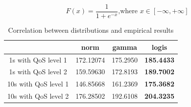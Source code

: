 \documentclass[conference]{../../setup/IEEEtran}
\makeatletter
\def\blue#1{\textcolor{beamer@blendedblue}{#1}}
\newcommand{\Equation}[2]{
	\begin{equation}\label{eq:#1}
		#2
	\end{equation}
}
\newcommand{\Table}[4]{
	\begin{table}[h!]
	\begin{center}
		\begin{tabular}{#1}\hline
			#4
		\end{tabular}
		\caption{\label{table:#2} #3.}
	\end{center}
	\end{table}
}
\makeatother
\begin{document}
\begin{equation}
F(x) = \frac{1}{1 + e^{-x}} \mbox{,where } x\in \left[ -\infty, +\infty\right]
\end{equation}




%

\begin{table} [!htb]
\caption{Correlation between distributions and empirical results}
\centering
  \begin{tabular}{ | c | c | c | c | }
    \hline
	\                    & norm      & gamma    & logis         \\\hline 
	1s  with QoS level 1 & 172.12074 & 175.2950 & \bf{185.4433} \\\hline 
	1s  with QoS level 2 & 159.59630 & 172.8193 & \bf{189.7002} \\\hline 
	10s with QoS level 1 & 146.85668 & 161.2369 & \bf{175.3682} \\\hline 
	10s with QoS level 2 & 176.28502 & 192.6108 & \bf{204.3235} \\\hline
  \end{tabular}
\label{table:correlation}
\end{table}

\end{document}
